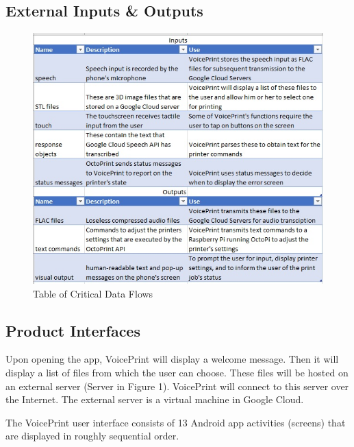 \subsection{External Inputs \& Outputs}

\begin{figure}[h!]
	\centering
   	\includegraphics[width=1.00\textwidth]{images/table2.jpg}
   	\caption{Table of Critical Data Flows}
\end{figure}

\subsection{Product Interfaces}
Upon opening the app, VoicePrint will display a welcome message. Then it will display a list of files from which the user can choose. These files will be hosted on an external server (Server in Figure 1). VoicePrint will connect to this server over the Internet. The external server is a virtual machine in Google Cloud.

The VoicePrint user interface consists of 13 Android app activities (screens) that are displayed in roughly sequential order.
\newpage


